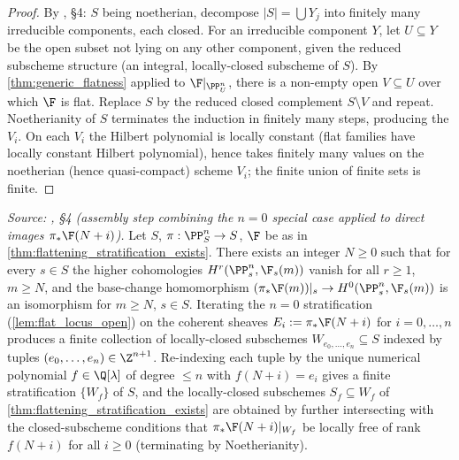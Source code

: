 \begin{proof}
  By \cite{nitsure-hilbert-quot}, \S4: \(S\) being noetherian, decompose \(|S| = \bigcup Y_j\) into
  finitely many irreducible components, each closed.  For an irreducible
  component \(Y\), let \(U \subseteq Y\) be the open subset not lying on any other
  component, given the reduced subscheme structure (an integral, locally-closed
  subscheme of \(S\)).  By \cref{thm:generic_flatness} applied to
  \(\F|_{\PP^n_U}\), there is a non-empty open \(V \subseteq U\) over which \(\F\) is
  flat.  Replace \(S\) by the reduced closed complement \(S \setminus V\) and
  repeat. Noetherianity of \(S\) terminates the induction in finitely many
  steps, producing the \(V_i\).  On each \(V_i\) the Hilbert polynomial is locally
  constant (flat families have locally constant Hilbert polynomial), hence
  takes finitely many values on the noetherian (hence quasi-compact) scheme
  \(V_i\); the finite union of finite sets is finite.
\end{proof}

\begin{lemma}
  \label{lem:noetherian_induction_strata}
  \textit{Source: \cite{nitsure-hilbert-quot}, \S4 (assembly step combining the \(n=0\) special case
  applied to direct images \(\pi_*\F(N+i)\)).}
  Let \(S\), \(\pi : \PP^n_S \to S\), \(\F\) be as in
  \cref{thm:flattening_stratification_exists}.  There exists an integer
  \(N \ge 0\) such that for every \(s \in S\) the higher cohomologies
  \(H^r(\PP^n_s, \F_s(m))\) vanish for all \(r \ge 1\), \(m \ge N\), and the base-change
  homomorphism \((\pi_* \F(m))|_s \to H^0(\PP^n_s, \F_s(m))\) is an isomorphism
  for \(m \ge N\), \(s \in S\).  Iterating the \(n=0\) stratification
  (\cref{lem:flat_locus_open}) on the coherent sheaves \(E_i := \pi_* \F(N+i)\)
  for \(i = 0, \dots, n\) produces a finite collection of locally-closed
  subschemes \(W_{e_0, \dots, e_n} \subseteq S\) indexed by tuples
  \((e_0, \dots, e_n) \in \Z^{n+1}\). Re-indexing each tuple by the unique
  numerical polynomial \(f \in \Q[\lambda]\) of degree \(\le n\) with
  \(f(N+i) = e_i\) gives a finite stratification \(\{W_f\}\) of \(S\), and the
  locally-closed subschemes \(S_f \subseteq W_f\) of
  \cref{thm:flattening_stratification_exists} are obtained by further
  intersecting with the closed-subscheme conditions that
  \(\pi_* \F(N+i)|_{W_f}\) be locally free of rank \(f(N+i)\) for all \(i \ge 0\)
  (terminating by Noetherianity).
\end{lemma}

